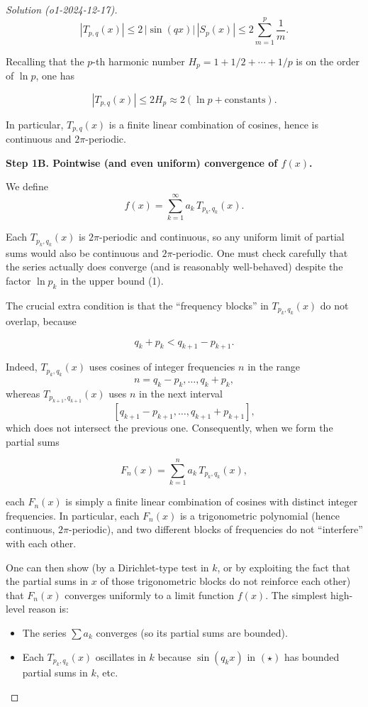 \documentclass[11pt]{article}
\numberwithin{equation}{section}
\begin{document}
\begin{proof}[Solution (o1-2024-12-17)]
\[
|T_{p,q}(x)| \le 2\,|\sin(qx)|\,|S_p(x)|
\le 2\sum_{m=1}^{p} \frac{1}{m}.
\]

Recalling that the \(p\)-th harmonic number \(H_p = 1 + 1/2 + \cdots + 1/p\) is on the order of \(\ln p\), one has

\[
\tag{1}
|T_{p,q}(x)| \le 2H_p \approx 2(\ln p + \text{constants}).
\]

In particular, \(T_{p,q}(x)\) is a finite linear combination of cosines, hence is continuous and \(2\pi\)-periodic.

\hrulefill

\textbf{Step 1B.  Pointwise (and even uniform) convergence of \(f(x)\).}

We define  
\[
f(x)=\sum_{k=1}^{\infty} a_k\, T_{p_k,q_k}(x).
\]

Each \(T_{p_k,q_k}(x)\) is \(2\pi\)-periodic and continuous, so any uniform limit of partial sums would also be continuous and \(2\pi\)-periodic. One must check carefully that the series actually does converge (and is reasonably well-behaved) despite the factor \(\ln p_k\) in the upper bound (1).

The crucial extra condition is that the ``frequency blocks'' in \(T_{p_k,q_k}(x)\) do not overlap, because

\[
q_k + p_k < q_{k+1} - p_{k+1}.
\]

Indeed, \(T_{p_k,q_k}(x)\) uses cosines of integer frequencies \(n\) in the range
\[
n = q_k - p_k,\ldots, q_k + p_k,
\]
whereas \(T_{p_{k+1},q_{k+1}}(x)\) uses \(n\) in the next interval
\[
[q_{k+1}-p_{k+1},\ldots,q_{k+1}+p_{k+1}],
\]
which does not intersect the previous one. Consequently, when we form the partial sums

\[
F_n(x)=\sum_{k=1}^{n} a_k\, T_{p_k,q_k}(x),
\]

each \(F_n(x)\) is simply a finite linear combination of cosines with distinct integer frequencies. In particular, each \(F_n(x)\) is a trigonometric polynomial (hence continuous, \(2\pi\)-periodic), and two different blocks of frequencies do not ``interfere'' with each other.

One can then show (by a Dirichlet-type test in \(k\), or by exploiting the fact that the partial sums in \(x\) of those trigonometric blocks do not reinforce each other) that \(F_n(x)\) converges uniformly to a limit function \(f(x)\). The simplest high-level reason is:

\begin{itemize}
\item The series \(\sum a_k\) converges (so its partial sums are bounded).
\item Each \(T_{p_k,q_k}(x)\) oscillates in \(k\) because \(\sin(q_k x)\) in \((\star)\) has bounded partial sums in \(k\), etc.
\end{itemize}


\end{proof}
\end{document}
